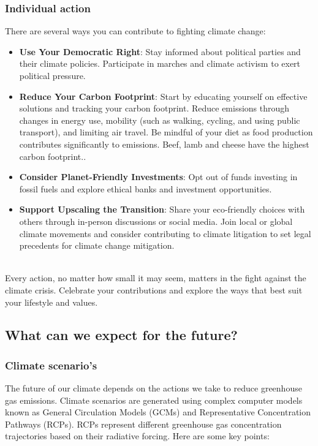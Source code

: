 \documentclass[../summary.tex]{subfiles}
\begin{document}
\subsubsection{Individual action}

There are several ways you can contribute to fighting climate change:

\begin{itemize}
	\item \textbf{Use Your Democratic Right}: Stay informed about political parties and their climate policies. Participate in marches and climate activism to exert political pressure.
	\item \textbf{Reduce Your Carbon Footprint}: Start by educating yourself on effective solutions and tracking your carbon footprint. Reduce emissions through changes in energy use, mobility (such as walking, cycling, and using public transport), and limiting air travel. Be mindful of your diet as food production contributes significantly to emissions. Beef, lamb and cheese have the highest carbon footprint..
	\item \textbf{Consider Planet-Friendly Investments}: Opt out of funds investing in fossil fuels and explore ethical banks and investment opportunities.
	\item \textbf{Support Upscaling the Transition}: Share your eco-friendly choices with others through in-person discussions or social media. Join local or global climate movements and consider contributing to climate litigation to set legal precedents for climate change mitigation.
\end{itemize}
\ \\
Every action, no matter how small it may seem, matters in the fight against the climate crisis. Celebrate your contributions and explore the ways that best suit your lifestyle and values.
\newpage

\subsection{What can we expect for the future?}

\subsubsection{Climate scenario's}

The future of our climate depends on the actions we take to reduce greenhouse gas emissions. Climate scenarios are generated using complex computer models known as General Circulation Models (GCMs) and Representative Concentration Pathways (RCPs). RCPs represent different greenhouse gas concentration trajectories based on their radiative forcing. Here are some key points:
\end{document}
